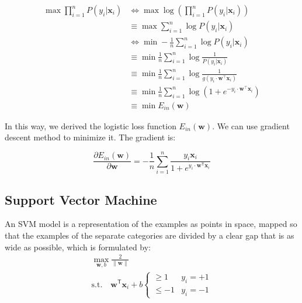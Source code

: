 \documentclass[journal, a4paper]{IEEEtran}
\begin{document}
\begin{equation}
    \begin{aligned}
\max \prod_{i=1}^{n} P\left(y_i | \mathbf{x}_i\right) & \Leftrightarrow \max \log \left(\prod_{i=1}^{n} P\left(y_{i} | \mathbf{x}_{i}\right)\right) \\
& \equiv \max \sum_{i=1}^{n} \log P\left(y_i | \mathbf{x}_{i}\right) \\
& \Leftrightarrow \min -\frac{1}{n} \sum_{i=1}^{n} \log P\left(y_i | \mathbf{x}_{i}\right) \\
& \equiv \min \frac{1}{n} \sum_{i=1}^{n} \log \frac{1}{P\left(y_i | \mathbf{x}_{i}\right)} \\
& \equiv \min \frac{1}{n} \sum_{i=1}^{n} \log \frac{1}{g\left(y_i \cdot \mathbf{w}^{\top} \mathbf{x}_{i}\right)} \\
& \equiv \min \frac{1}{n} \sum_{i=1}^{n} \log \left(1+e^{-y_i \cdot \mathbf{w}^{\top} \mathbf{x}_{i}}\right) \\
& \equiv \min E_{in}(\mathbf{w})
    \end{aligned}
\end{equation}

In this way, we derived the logistic loss function $E_{in}(\mathbf{w})$. We can use gradient descent method to minimize it. The gradient is:

\begin{equation}
\frac{\partial E_{in}(\mathbf{w})}{\partial \mathbf{w}}
=-\frac{1}{n} \sum_{i=1}^{n} \frac{y_i \mathbf{x}_i}{1+e^{y_i \cdot \mathbf{w}^\mathsf{T} \mathbf{x}_i}}
\end{equation}

\subsection{Support Vector Machine}

An SVM model is a representation of the examples as points in space, mapped so that the examples of the separate categories are divided by a clear gap that is as wide as possible, which is formulated by:
\begin{equation}
    \begin{array}{l}
    \max_{\mathbf{w}, b} \frac{2}{\|\mathbf{w}\|} \\
    \text {s.t.} \quad \mathbf{w}^\mathsf{T} \mathbf{x}_i+b\left\{
        \begin{array}{ll}
            \geqslant 1 & y_i=+1 \\
            \leqslant-1 & y_i=-1
        \end{array}\right.
    \end{array}
\end{equation}
\end{document}
